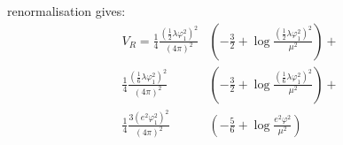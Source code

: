 \MSbar renormalisation gives:
\begin{align}
V_R=\frac{1}{4}\frac{(\frac{1}{2}\lambda\varphi_1^2)^2}{(4\pi)^2}&\left(-\frac{3}{2}+ 
\log{\frac{(\frac{1}{2}\lambda\varphi_1^2)^2}{\mu^2}}\right) + \\
\frac{1}{4}\frac{(\frac{1}{6}\lambda\varphi_1^2)^2}{(4\pi)^2}&\left(-\frac{3}{2}+ 
\log{\frac{(\frac{1}{6}\lambda\varphi_1^2)^2}{\mu^2}}\right) + \\
\frac{1}{4}\frac{3(e^2\varphi_1^2)^2}{(4\pi)^2}&\left(-\frac{5}{6}+
\log{\frac{e^2\varphi^2}{\mu^2}}\right)
\end{align}


